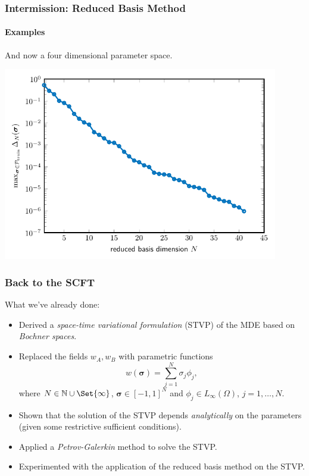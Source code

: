 \begin{frame}[t]
    \frametitle{Intermission: Reduced Basis Method}
    \framesubtitle{Examples}

    And now a four dimensional parameter space.

    \centering
    \includegraphics[width=0.9\textwidth]{figures/ch5ex2_rbm_error.pdf}
\end{frame}


\begin{frame}[t]
    \frametitle{Back to the SCFT}

    What we've already done:

    \begin{itemize}
        \item<1-> Derived a \emph{space-time variational formulation} (STVP) of the MDE based on \emph{Bochner spaces}.
        \item<2-> Replaced the fields $w_A, w_B$ with parametric functions
        \begin{equation}
            w(\bm \sigma) = \sum_{j = 1}^{N} \sigma_{j} \phi_{j},
        \end{equation}
        where $N \in \mathbb{N} \cup \Set{ \infty }$, $\bm \sigma \in [-1, 1]^{N}$ and $\phi_{j} \in L_{\infty}(\Omega)$, $j = 1, \dots, N$.
        \item<2-> Shown that the solution of the STVP depends \emph{analytically} on the parameters (given some restrictive sufficient conditions).
        \item<3-> Applied a \emph{Petrov-Galerkin} method to solve the STVP.
        \item<3-> Experimented with the application of the reduced basis method on the STVP.
    \end{itemize}

\end{frame}

